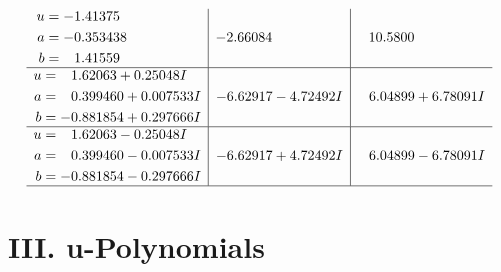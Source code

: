 \documentclass[1p]{elsarticle_modified}
\theoremstyle{definition}
\begin{document}
$$\begin{array}{c|c|c}
\begin{aligned}
u &= -1.41375\phantom{ +0.000000I} \\
a &= -0.353438\phantom{ +0.000000I} \\
b &= \phantom{-}1.41559\phantom{ +0.000000I}\end{aligned}
 & -2.66084\phantom{ +0.000000I} & \phantom{-}10.5800\phantom{ +0.000000I} \\ \hline\begin{aligned}
u &= \phantom{-}1.62063 + 0.25048 I \\
a &= \phantom{-}0.399460 + 0.007533 I \\
b &= -0.881854 + 0.297666 I\end{aligned}
 & -6.62917 - 4.72492 I & \phantom{-}6.04899 + 6.78091 I \\ \hline\begin{aligned}
u &= \phantom{-}1.62063 - 0.25048 I \\
a &= \phantom{-}0.399460 - 0.007533 I \\
b &= -0.881854 - 0.297666 I\end{aligned}
 & -6.62917 + 4.72492 I & \phantom{-}6.04899 - 6.78091 I\\
 \hline 
 \end{array}$$\newpage
\newpage\renewcommand{\arraystretch}{1}
\centering \section*{ III. u-Polynomials}
\end{document}

